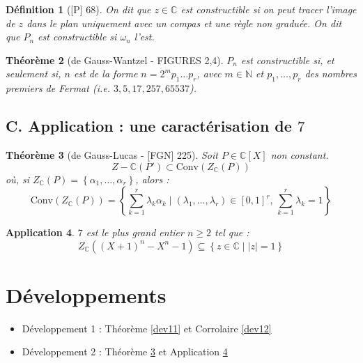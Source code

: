 \documentclass[10pt, a4paper, parskip=full, twoside, twocolumn]{report}
\newtheorem{definition}{Définition}
\newtheorem{theorem}[definition]{Théorème}
\newtheorem{application}[definition]{Application}
\newcommand{\IN}{\mathbb{N}}
\newcommand{\IC}{\mathbb{C}}
\begin{document}
\begin{definition}[\textnormal{[P] 68}]
	On dit que $z\in\IC$ est \emph{constructible} si on peut tracer l'image de $z$ dans le plan uniquement avec un compas et une règle non graduée.
	On dit que $P_n$ est constructible si $\omega_n$ l'est.
\end{definition}

\begin{theorem}[de Gauss-Wantzel - FIGURES 2,4]
	$P_n$ est constructible si, et seulement si, $n$ est de la forme $n=2^m p_1\dots p_r$, avec $m\in \IN$ et $p_1, \dots, p_r$ des nombres premiers de Fermat (\emph{i.e.} $3,5,17,257, 65537$).
\end{theorem}

\subsection*{C. Application : une caractérisation de $7$}

\begin{tcolorbox}[
    breakable, %
    colback=developpement, %
    colframe=gray!0!black, %
    boxrule=0pt, %
    arc=1mm, %
	boxsep=0pt,
	left=0pt, right=0pt, top=0pt, bottom=0pt
]
\begin{theorem}[de Gauss-Lucas - \textnormal{[FGN] 225}]
	\label{102dev21}
	Soit $P\in\IC[X]$ non constant.
	$$Z-{\IC}(P')\subset \text{Conv}(Z_{\IC}(P))$$
	où, si $Z_{\IC}(P) = \left\{\alpha_1,\dots,\alpha_r\right\}$, alors :
	$$\text{Conv}(Z_{\IC}(P)) = \left\{\sum_{k=1}^{r}\lambda_k\alpha_k \mid (\lambda_1,\dots,\lambda_r)\in \left[0,1\right]^r,\, \sum_{k=1}^{r}\lambda_k = 1\right\}$$
\end{theorem}

\begin{application}
	\label{102dev22}
	$7$ est le plus grand entier $n\geq 2$ tel que :
	$$Z_{\IC}((X+1)^n - X^n - 1)\subseteq \left\{z\in \IC \mid |z| = 1\right\}$$
\end{application}
\end{tcolorbox}

\section*{Développements}
\begin{itemize}
	\item Développement 1 : Théorème \ref{dev11} et Corrolaire \ref{dev12}
	\item Développement 2 : Théorème \ref{102dev21} et Application \ref{102dev22}
\end{itemize}
\end{document}
